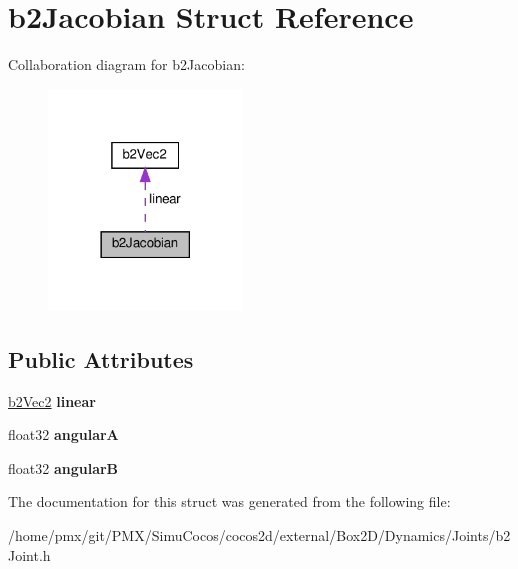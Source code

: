 \hypertarget{structb2Jacobian}{}\section{b2\+Jacobian Struct Reference}
\label{structb2Jacobian}


Collaboration diagram for b2\+Jacobian\+:
\nopagebreak
\begin{figure}[H]
\begin{center}
\leavevmode
\includegraphics[width=146pt]{structb2Jacobian__coll__graph}
\end{center}
\end{figure}
\subsection*{Public Attributes}
\begin{DoxyCompactItemize}
\item 
\mbox{\label{structb2Jacobian_aa63199b443d411972b9cb6aac6c7cb34}} 
\hyperlink{structb2Vec2}{b2\+Vec2} {\bfseries linear}
\item 
\mbox{\label{structb2Jacobian_a0669f849afcdc154b36f86cb0529d2bc}} 
float32 {\bfseries angularA}
\item 
\mbox{\label{structb2Jacobian_a3bbdbd8e46f4fa9be2e50434edaaeb14}} 
float32 {\bfseries angularB}
\end{DoxyCompactItemize}


The documentation for this struct was generated from the following file\+:\begin{DoxyCompactItemize}
\item 
/home/pmx/git/\+P\+M\+X/\+Simu\+Cocos/cocos2d/external/\+Box2\+D/\+Dynamics/\+Joints/b2\+Joint.\+h\end{DoxyCompactItemize}

